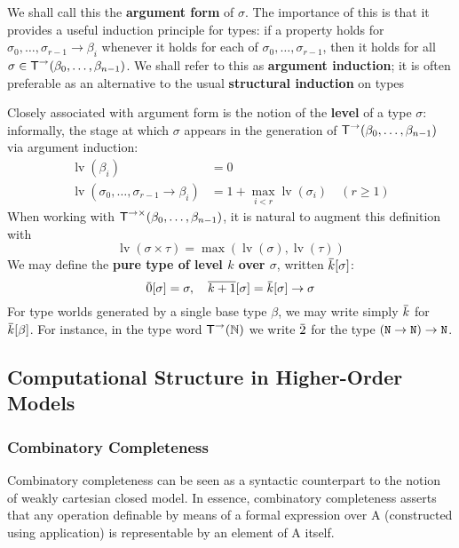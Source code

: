 \documentclass[11pt]{article}
\DeclareMathOperator{\lv}{lv}
\begin{document}
We shall call this the \textbf{argument form} of \(\sigma\). The importance of this is that it provides a useful
induction principle for types: if a property holds for \(\sigma_0,\dots,\sigma_{r-1}\to\beta_i\) whenever it holds
for each of \(\sigma_0,\dots,\sigma_{r-1}\), then it holds for all \(\sigma\in\textsf{T}^{\to}(\beta_0,\dots,\beta_{n-1})\). We shall
refer to this as \textbf{argument induction}; it is often preferable as an alternative to the usual
\textbf{structural induction} on types

Closely associated with argument form is the notion of the \textbf{level} of a type \(\sigma\): informally, the
stage at which \(\sigma\) appears in the generation of \(\textsf{T}^\to(\beta_0,\dots,\beta_{n-1})\) via argument induction:
\begin{align*}
\lv(\beta_i)&=0\\
\lv(\sigma_0,\dots,\sigma_{r-1}\to\beta_i)&=1+\max_{i<r}\lv(\sigma_i)\quad(r\ge 1)
\end{align*}
When working with \(\textsf{T}^{\to\times}(\beta_0,\dots,\beta_{n-1})\), it is natural to augment this definition with
\begin{equation*}
\lv(\sigma\times\tau)=\max(\lv(\sigma),\lv(\tau))
\end{equation*}
We may define the \textbf{pure type of level \(k\) over \(\sigma\)}, written \(\bark[\sigma]\):
\begin{equation*}
\bbar{0}[\sigma]=\sigma,\quad\ove{k+1}[\sigma]=\bark[\sigma]\to\sigma
\end{equation*}
For type worlds generated by a single base type \(\beta\), we may write simply \(\bark\)
for \(\bark[\beta]\). For instance, in the type word \(\textsf{T}^{\to}(\mathbb{N})\) we write \(\bbar{2}\) for the
type \((\texttt{N}\to\texttt{N})\to\texttt{N}\).
\subsection{Computational Structure in Higher-Order Models}
\label{sec:orgad3ec4f}
\subsubsection{Combinatory Completeness}
\label{sec:org945a430}
Combinatory completeness can be seen as a syntactic counterpart to the notion of weakly
cartesian closed model. In essence, combinatory completeness asserts that any operation
definable by means of a formal expression over A (constructed using application) is
representable by an element of A itself.
\end{document}
